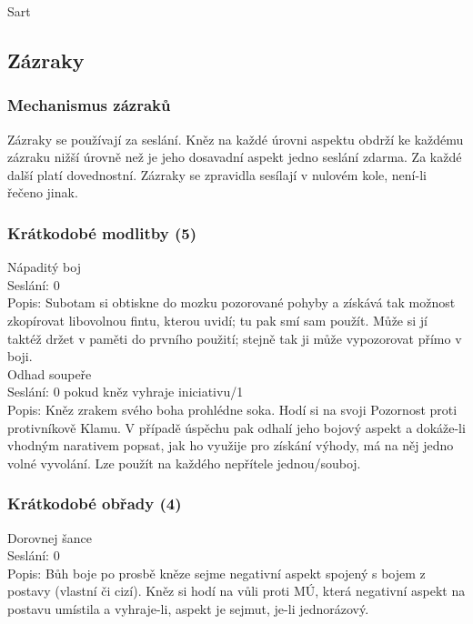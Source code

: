 \documentclass[../../main.tex]{subfiles}
\begin{document}
Sart\\


\subsection{Zázraky}
\label{sec:subotam-zazraky}

\subsubsection{Mechanismus zázraků}
Zázraky se používají za seslání. Kněz na každé úrovni aspektu obdrží ke každému zázraku nižší úrovně než je jeho dosavadní aspekt jedno seslání zdarma. Za každé další platí dovednostní.  Zázraky se zpravidla sesílají v nulovém kole, není-li řečeno jinak.

\subsubsection{Krátkodobé modlitby (5)}

Nápaditý boj\\
Seslání: 0\\
Popis: Subotam si obtiskne do  mozku pozorované pohyby a  získává tak  možnost zkopírovat libovolnou fintu, kterou uvidí; tu pak smí sam použít. Může si jí taktéž držet v paměti do prvního použití; stejně tak ji může vypozorovat přímo v boji.\\


Odhad soupeře\\
Seslání: 0 pokud kněz vyhraje iniciativu/1\\
Popis: Kněz zrakem svého boha prohlédne soka. Hodí si na svoji Pozornost proti protivníkově Klamu. V případě úspěchu pak odhalí jeho bojový aspekt a dokáže-li vhodným narativem popsat, jak ho využije pro získání výhody, má na něj jedno volné vyvolání. Lze použít na každého nepřítele jednou/souboj. \\


\subsubsection{Krátkodobé obřady (4)}


Dorovnej šance\\
Seslání: 0 \\
Popis: Bůh boje po prosbě kněze sejme negativní aspekt spojený s bojem z postavy (vlastní či cizí).  Kněz si hodí na vůli proti MÚ, která negativní aspekt na postavu umístila a vyhraje-li, aspekt je sejmut, je-li jednorázový. \\
\end{document}
